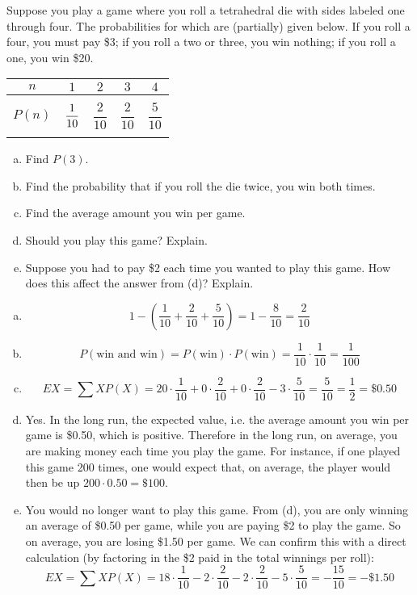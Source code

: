 \documentclass[11pt,letterpaper]{article}
\begin{document}
 Suppose you play a game where you roll a tetrahedral die with sides labeled one through four. The probabilities for which are (partially) given below. If you roll a four, you must pay \$3; if you roll a two or three, you win nothing; if you roll a one, you win \$20. 
	\begin{table}[!ht]
	\centering 
	\begin{tabular}{|c||c|c|c|c|} \hline 
	$n$ & $1$ & $2$ & $3$ & $4$ \\ \hline 
	$P(n)$ & $\dfrac{1\rule{0pt}{2.9ex}}{10\rule[-1.3ex]{0pt}{0pt}}$ & $\dfrac{2}{10}$ & $\mathit{\dfrac{2}{10}}$ & $\dfrac{5}{10}$ \\ \hline 
	\end{tabular}
	\end{table}

\begin{enumerate}[(a)]
\item Find $P(3)$. 
\item Find the probability that if you roll the die twice, you win both times. 
\item Find the average amount you win per game. 
\item Should you play this game? Explain.
\item Suppose you had to pay \$2 each time you wanted to play this game. How does this affect the answer from (d)? Explain. 
\end{enumerate} \pspace

\sol
\begin{enumerate}[(a)]
\item 
	\[
	1 - \left( \dfrac{1}{10} + \dfrac{2}{10} + \dfrac{5}{10} \right)= 1 - \dfrac{8}{10}= \dfrac{2}{10}
	\]

\item 
	\[
	P(\text{win and win})= P(\text{win}) \cdot P(\text{win})= \dfrac{1}{10} \cdot \dfrac{1}{10}= \dfrac{1}{100}
	\]

\item 
	\[
	EX= \sum X P(X)= 20 \cdot \dfrac{1}{10} + 0 \cdot \dfrac{2}{10} + 0 \cdot \dfrac{2}{10}  - 3 \cdot \dfrac{5}{10}= \dfrac{5}{10}= \dfrac{1}{2}= \$0.50 
	\]

\item Yes. In the long run, the expected value, i.e. the average amount you win per game is \$0.50, which is positive. Therefore in the long run, on average, you are making money each time you play the game. For instance, if one played this game 200 times, one would expect that, on average, the player would then be up $200 \cdot 0.50= \$100$. 

\item You would no longer want to play this game. From (d), you are only winning an average of \$0.50 per game, while you are paying \$2 to play the game. So on average, you are losing \$1.50 per game. We can confirm this with a direct calculation (by factoring in the \$2 paid in the total winnings per roll): 
	\[
	EX= \sum X P(X)= 18 \cdot \dfrac{1}{10} - 2 \cdot \dfrac{2}{10} - 2 \cdot \dfrac{2}{10}  - 5 \cdot \dfrac{5}{10}= -\dfrac{15}{10}= -\$1.50
	\]
\end{enumerate}
\end{document}

